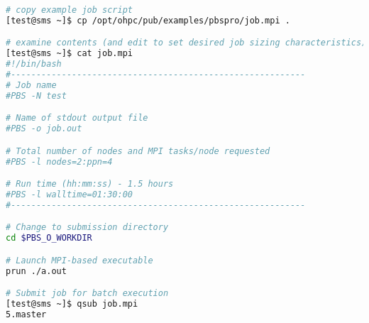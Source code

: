 \begin{lstlisting}[language=bash,keywords={}]
# copy example job script
[test@sms ~]$ cp /opt/ohpc/pub/examples/pbspro/job.mpi .

# examine contents (and edit to set desired job sizing characteristics)
[test@sms ~]$ cat job.mpi
#!/bin/bash
#----------------------------------------------------------
# Job name
#PBS -N test

# Name of stdout output file
#PBS -o job.out

# Total number of nodes and MPI tasks/node requested
#PBS -l nodes=2:ppn=4

# Run time (hh:mm:ss) - 1.5 hours
#PBS -l walltime=01:30:00
#----------------------------------------------------------

# Change to submission directory
cd $PBS_O_WORKDIR

# Launch MPI-based executable
prun ./a.out

# Submit job for batch execution
[test@sms ~]$ qsub job.mpi
5.master

\end{lstlisting}
